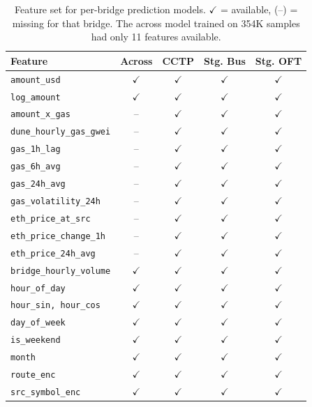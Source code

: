 \begin{table}[h]
\centering
\small
\caption{Feature set for per-bridge prediction models. $\checkmark$ = available, (--) = missing for that bridge. The across model trained on 354K samples had only 11 features available.}
\label{tab:features}
\begin{tabular}{lcccc}
\toprule
\textbf{Feature} & \textbf{Across} & \textbf{CCTP} & \textbf{Stg. Bus} & \textbf{Stg. OFT} \\
\midrule
\texttt{amount\_usd}              & $\checkmark$ & $\checkmark$ & $\checkmark$ & $\checkmark$ \\
\texttt{log\_amount}              & $\checkmark$ & $\checkmark$ & $\checkmark$ & $\checkmark$ \\
\texttt{amount\_x\_gas}           & --            & $\checkmark$ & $\checkmark$ & $\checkmark$ \\
\texttt{dune\_hourly\_gas\_gwei}  & --            & $\checkmark$ & $\checkmark$ & $\checkmark$ \\
\texttt{gas\_1h\_lag}             & --            & $\checkmark$ & $\checkmark$ & $\checkmark$ \\
\texttt{gas\_6h\_avg}             & --            & $\checkmark$ & $\checkmark$ & $\checkmark$ \\
\texttt{gas\_24h\_avg}            & --            & $\checkmark$ & $\checkmark$ & $\checkmark$ \\
\texttt{gas\_volatility\_24h}     & --            & $\checkmark$ & $\checkmark$ & $\checkmark$ \\
\texttt{eth\_price\_at\_src}      & --            & $\checkmark$ & $\checkmark$ & $\checkmark$ \\
\texttt{eth\_price\_change\_1h}   & --            & $\checkmark$ & $\checkmark$ & $\checkmark$ \\
\texttt{eth\_price\_24h\_avg}     & --            & $\checkmark$ & $\checkmark$ & $\checkmark$ \\
\texttt{bridge\_hourly\_volume}   & $\checkmark$ & $\checkmark$ & $\checkmark$ & $\checkmark$ \\
\texttt{hour\_of\_day}            & $\checkmark$ & $\checkmark$ & $\checkmark$ & $\checkmark$ \\
\texttt{hour\_sin, hour\_cos}     & $\checkmark$ & $\checkmark$ & $\checkmark$ & $\checkmark$ \\
\texttt{day\_of\_week}            & $\checkmark$ & $\checkmark$ & $\checkmark$ & $\checkmark$ \\
\texttt{is\_weekend}              & $\checkmark$ & $\checkmark$ & $\checkmark$ & $\checkmark$ \\
\texttt{month}                    & $\checkmark$ & $\checkmark$ & $\checkmark$ & $\checkmark$ \\
\texttt{route\_enc}               & $\checkmark$ & $\checkmark$ & $\checkmark$ & $\checkmark$ \\
\texttt{src\_symbol\_enc}         & $\checkmark$ & $\checkmark$ & $\checkmark$ & $\checkmark$ \\
\bottomrule
\end{tabular}
\end{table}

